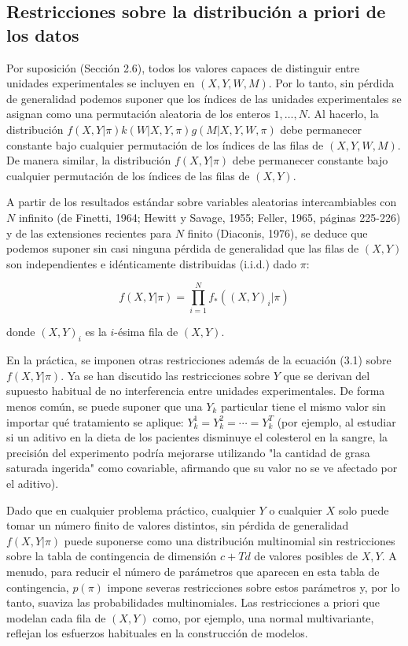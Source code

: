 \documentclass[12pt,a4paper]{article}
\begin{document}
\subsection{Restricciones sobre la distribución a priori de los datos}

Por suposición (Sección 2.6), todos los valores capaces de distinguir entre unidades experimentales se incluyen en $(X, Y, W, M)$. Por lo tanto, sin pérdida de generalidad podemos suponer que los índices de las unidades experimentales se asignan como una permutación aleatoria de los enteros $1,\dots, N$. Al hacerlo, la distribución $f(X,Y|\pi)k(W|X,Y,\pi)g(M|X,Y,W,\pi)$ debe permanecer constante bajo cualquier permutación de los índices de las filas de $(X, Y, W, M)$. De manera similar, la distribución $f(X,Y|\pi)$ debe permanecer constante bajo cualquier permutación de los índices de las filas de $(X, Y)$.

A partir de los resultados estándar sobre variables aleatorias intercambiables con $N$ infinito (de Finetti, 1964; Hewitt y Savage, 1955; Feller, 1965, páginas 225-226) y de las extensiones recientes para $N$ finito (Diaconis, 1976), se deduce que podemos suponer sin casi ninguna pérdida de generalidad que las filas de $(X, Y)$ son independientes e idénticamente distribuidas (i.i.d.) dado $\pi$:

\begin{equation}\label{eq:3.1}
f(X,Y|\pi) = \prod_{i=1}^{N} f_*((X,Y)_i|\pi) \tag{3.1}
\end{equation}

\noindent donde $(X,Y)_i$ es la $i$-ésima fila de $(X, Y)$.

En la práctica, se imponen otras restricciones además de la ecuación (3.1) sobre $f(X,Y|\pi)$. Ya se han discutido las restricciones sobre $Y$ que se derivan del supuesto habitual de no interferencia entre unidades experimentales. De forma menos común, se puede suponer que una $Y_k$ particular tiene el mismo valor sin importar qué tratamiento se aplique: $Y_k^1 = Y_k^2 = \cdots = Y_k^T$ (por ejemplo, al estudiar si un aditivo en la dieta de los pacientes disminuye el colesterol en la sangre, la precisión del experimento podría mejorarse utilizando "la cantidad de grasa saturada ingerida" como covariable, afirmando que su valor no se ve afectado por el aditivo).

Dado que en cualquier problema práctico, cualquier $Y$ o cualquier $X$ solo puede tomar un número finito de valores distintos, sin pérdida de generalidad $f(X,Y|\pi)$ puede suponerse como una distribución multinomial sin restricciones sobre la tabla de contingencia de dimensión $c+Td$ de valores posibles de $X, Y$. A menudo, para reducir el número de parámetros que aparecen en esta tabla de contingencia, $p(\pi)$ impone severas restricciones sobre estos parámetros y, por lo tanto, suaviza las probabilidades multinomiales. Las restricciones a priori que modelan cada fila de $(X, Y)$ como, por ejemplo, una normal multivariante, reflejan los esfuerzos habituales en la construcción de modelos.
\end{document}
